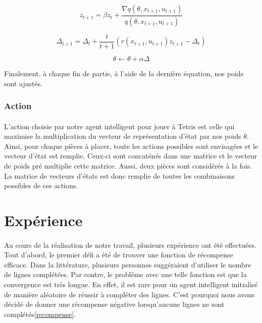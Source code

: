 \documentclass[a4paper, 12pt]{article} %
\begin{document}
	    \begin{equation}
	        z_{t+1} = \beta z_{t} + \frac{\nabla q(\theta, x_{t+1}, u_{t+1})}{q(\theta, x_{t+1}, u_{t+1})}
	    \end{equation}

	    \begin{equation}
	    	\Delta_{t+1} = \Delta_{t} + \frac{t}{t+1} (r(x_{t+1}, u_{t+1})z_{t+1} - \Delta_{t})
	    \end{equation}

	    \begin{equation}
	        \theta \leftarrow  \theta + \alpha \Delta
	    \end{equation}

	    Finalement, à chaque fin de partie, à l'aide de la dernière équation, nos poids sont ajustés.

	\subsubsection{Action}
    	    \paragraph{}
	    L'action choisie par notre agent intelligent pour jouer à Tetris est celle qui maximise la multiplication
	    du vecteur de représentation d'état par nos poids $\theta$. Ainsi, pour chaque pièces à placer, toute les actions
	    possibles sont envisagées et le vecteur d'état est remplie. Ceux-ci sont concaténés dans une matrice et le vecteur 
	    de poids pré multiplie cette matrice. Aussi, deux pièces sont considérés à la fois. La matrice de vecteurs d'états
	    est donc remplie de toutes les combinaisons possibles de ces actions.

\section{Expérience}
    \paragraph{}
    Au cours de la réalisation de notre travail, plusieurs expérience ont été effectuées. Tout d'abord, le premier défi a été
    de trouver une fonction de récompense efficace. Dans la littérature, plusieurs personnes suggéraient d'utiliser le nombre
    de lignes complétées. Par contre, le problème avec une telle fonction est que la convergence est très longue. En effet,
    il est rare pour un agent intelligent initialisé de manière aléatoire de réussir à compléter des lignes. C'est pourquoi
    nous avons décidé de donner une récompense négative lorsqu'aucune lignes ne sont complétés\ref{recompense}.
\end{document}
